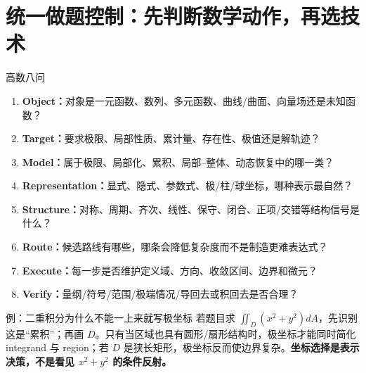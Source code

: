 \documentclass[11pt,a4paper,openany]{ctexbook}
\newcommand{\key}[1]{\textbf{\color{deep}#1}}\newcommand{\eng}[1]{\textit{#1}}\let\cleardoublepage\clearpage
\begin{document}
\chapter{统一做题控制：先判断数学动作，再选技术}
\begin{corebox}{高数八问}
\begin{enumerate}
\item \key{Object：}对象是一元函数、数列、多元函数、曲线/曲面、向量场还是未知函数？
\item \key{Target：}要求极限、局部性质、累计量、存在性、极值还是解轨迹？
\item \key{Model：}属于极限、局部化、累积、局部--整体、动态恢复中的哪一类？
\item \key{Representation：}显式、隐式、参数式、极/柱/球坐标，哪种表示最自然？
\item \key{Structure：}对称、周期、齐次、线性、保守、闭合、正项/交错等结构信号是什么？
\item \key{Route：}候选路线有哪些，哪条会降低复杂度而不是制造更难表达式？
\item \key{Execute：}每一步是否维护定义域、方向、收敛区间、边界和微元？
\item \key{Verify：}量纲/符号/范围/极端情况/导回去或积回去是否合理？
\end{enumerate}
\end{corebox}

\begin{examBox}{例：二重积分为什么不能一上来就写极坐标}
若题目求 $\iint_D (x^2+y^2)dA$，先识别这是“累积”；再画 $D$。只有当区域也具有圆形/扇形结构时，极坐标才能同时简化 integrand 与 region；若 $D$ 是狭长矩形，极坐标反而使边界复杂。\key{坐标选择是表示决策，不是看见 $x^2+y^2$ 的条件反射。}
\end{examBox}

\appendix
\end{document}
